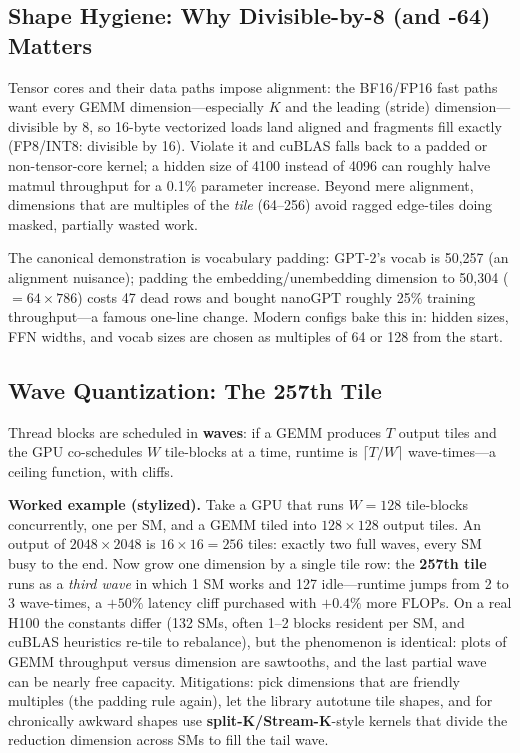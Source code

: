 \subsection{Shape Hygiene: Why Divisible-by-8 (and -64) Matters}

Tensor cores and their data paths impose alignment: the BF16/FP16 fast paths want every GEMM dimension---especially $K$ and the leading (stride) dimension---divisible by 8, so 16-byte vectorized loads land aligned and fragments fill exactly (FP8/INT8: divisible by 16). Violate it and cuBLAS falls back to a padded or non-tensor-core kernel; a hidden size of 4100 instead of 4096 can roughly halve matmul throughput for a 0.1\% parameter increase. Beyond mere alignment, dimensions that are multiples of the \textit{tile} (64--256) avoid ragged edge-tiles doing masked, partially wasted work.

The canonical demonstration is vocabulary padding: GPT-2's vocab is 50{,}257 (an alignment nuisance); padding the embedding/unembedding dimension to 50{,}304 ($= 64 \times 786$) costs 47 dead rows and bought nanoGPT roughly 25\% training throughput---a famous one-line change. Modern configs bake this in: hidden sizes, FFN widths, and vocab sizes are chosen as multiples of 64 or 128 from the start.

\subsection{Wave Quantization: The 257th Tile}

Thread blocks are scheduled in \textbf{waves}: if a GEMM produces $T$ output tiles and the GPU co-schedules $W$ tile-blocks at a time, runtime is $\lceil T/W \rceil$ wave-times---a ceiling function, with cliffs.

\textbf{Worked example (stylized).} Take a GPU that runs $W = 128$ tile-blocks concurrently, one per SM, and a GEMM tiled into $128\times128$ output tiles. An output of $2048 \times 2048$ is $16 \times 16 = 256$ tiles: exactly two full waves, every SM busy to the end. Now grow one dimension by a single tile row: the \textbf{257th tile} runs as a \textit{third wave} in which 1 SM works and 127 idle---runtime jumps from 2 to 3 wave-times, a $+50\%$ latency cliff purchased with $+0.4\%$ more FLOPs. On a real H100 the constants differ (132 SMs, often 1--2 blocks resident per SM, and cuBLAS heuristics re-tile to rebalance), but the phenomenon is identical: plots of GEMM throughput versus dimension are sawtooths, and the last partial wave can be nearly free capacity. Mitigations: pick dimensions that are friendly multiples (the padding rule again), let the library autotune tile shapes, and for chronically awkward shapes use \textbf{split-K/Stream-K}-style kernels that divide the reduction dimension across SMs to fill the tail wave.

